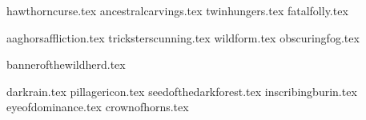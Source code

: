 
\raggedcolumns
\begin{multicols}{2}

\subtitle{\weaponenchantments}
\startsortedpricelist

{hawthorncurse.tex}
{ancestralcarvings.tex}
{twinhungers.tex}
{fatalfolly.tex}

\endsortedpricelist

\subtitle{\armourenchantments}
\startsortedpricelist

{aaghorsaffliction.tex}
{tricksterscunning.tex}
{wildform.tex}
{obscuringfog.tex}

\endsortedpricelist

\subtitle{\bannerenchantments}
\startsortedpricelist

{bannerofthewildherd.tex}

\endsortedpricelist

\subtitle{\artefacts}
\startsortedpricelist

{darkrain.tex}
{pillagericon.tex}
{seedofthedarkforest.tex}
{inscribingburin.tex}
{eyeofdominance.tex}
{crownofhorns.tex}

\endsortedpricelist
\end{multicols}
